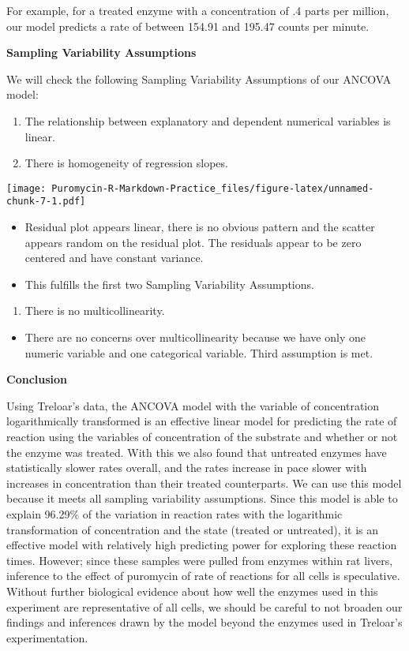 \documentclass[
]{article}
\providecommand{\tightlist}{%
  \setlength{\itemsep}{0pt}\setlength{\parskip}{0pt}}
\begin{document}
For example, for a treated enzyme with a concentration of .4 parts per
million, our model predicts a rate of between 154.91 and 195.47 counts
per minute.

\textbf{Sampling Variability Assumptions}

We will check the following Sampling Variability Assumptions of our
ANCOVA model:

\begin{enumerate}
\def\labelenumi{\arabic{enumi}.}
\item
  The relationship between explanatory and dependent numerical variables
  is linear.
\item
  There is homogeneity of regression slopes.
\end{enumerate}

\texttt{[image: Puromycin-R-Markdown-Practice\_files/figure-latex/unnamed-chunk-7-1.pdf]}

\begin{itemize}
\tightlist
\item
  Residual plot appears linear, there is no obvious pattern and the
  scatter appears random on the residual plot. The residuals appear to
  be zero centered and have constant variance.
\item
  This fulfills the first two Sampling Variability Assumptions.
\end{itemize}

\begin{enumerate}
\def\labelenumi{\arabic{enumi}.}
\setcounter{enumi}{2}
\tightlist
\item
  There is no multicollinearity.
\end{enumerate}

\begin{itemize}
\tightlist
\item
  There are no concerns over multicollinearity because we have only one
  numeric variable and one categorical variable. Third assumption is
  met.
\end{itemize}

\textbf{Conclusion}

Using Treloar's data, the ANCOVA model with the variable of
concentration logarithmically transformed is an effective linear model
for predicting the rate of reaction using the variables of concentration
of the substrate and whether or not the enzyme was treated. With this we
also found that untreated enzymes have statistically slower rates
overall, and the rates increase in pace slower with increases in
concentration than their treated counterparts. We can use this model
because it meets all sampling variability assumptions. Since this model
is able to explain 96.29\% of the variation in reaction rates with the
logarithmic transformation of concentration and the state (treated or
untreated), it is an effective model with relatively high predicting
power for exploring these reaction times. However; since these samples
were pulled from enzymes within rat livers, inference to the effect of
puromycin of rate of reactions for all cells is speculative. Without
further biological evidence about how well the enzymes used in this
experiment are representative of all cells, we should be careful to not
broaden our findings and inferences drawn by the model beyond the
enzymes used in Treloar's experimentation.
\end{document}
